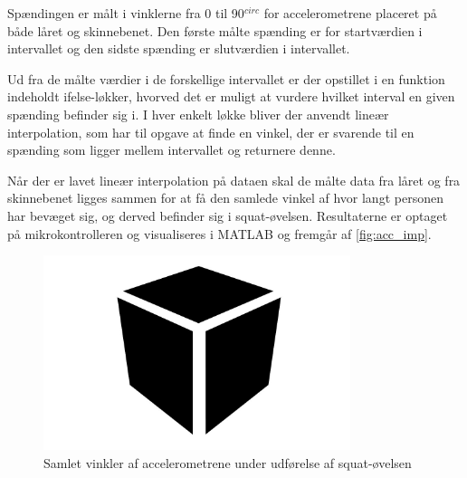 Spændingen er målt i vinklerne fra 0 til 90$^{circ}$ for accelerometrene placeret på både låret og skinnebenet. Den første målte spænding er for startværdien i intervallet og den sidste spænding er slutværdien i intervallet.

Ud fra de målte værdier i de forskellige intervallet er der opstillet i en funktion indeholdt ifelse-løkker, hvorved det er muligt at vurdere hvilket interval en given spænding befinder sig i. I hver enkelt løkke bliver der anvendt lineær interpolation, som har til opgave at finde en vinkel, der er svarende til en spænding som ligger mellem intervallet og returnere denne. 

Når der er lavet lineær interpolation på dataen skal de målte data fra låret og fra skinnebenet ligges sammen for at få den samlede vinkel af hvor langt personen har bevæget sig, og derved befinder sig i squat-øvelsen. Resultaterne er optaget på mikrokontrolleren og visualiseres i MATLAB og fremgår af \autoref{fig:acc_imp}.
 

\begin{figure}[H]
\centering
\includegraphics[width=0.8\textwidth]{figures/Pilotforsoeg/blackbox}
\caption{Samlet vinkler af accelerometrene under udførelse af squat-øvelsen}
\label{fig:acc_imp}
\end{figure}




